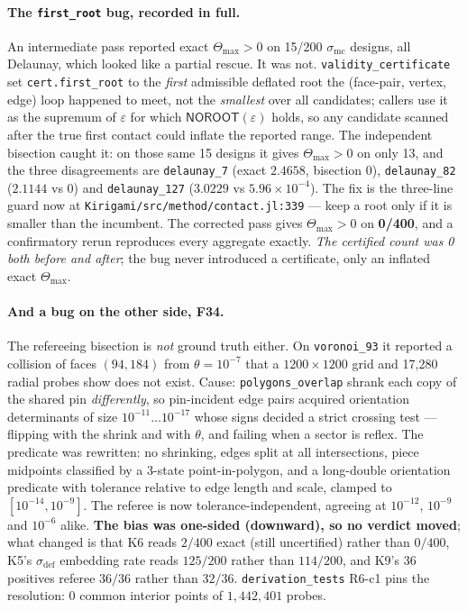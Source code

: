 \documentclass[11pt,a4paper]{article}
\theoremstyle{definition}
\newcommand{\Tmax}{\Theta_{\max}}
\newcommand{\file}[1]{\texttt{\small #1}}
\newcommand{\NOROOT}{\textsf{NOROOT}}
\begin{document}
\paragraph{The \file{first\_root} bug, recorded in full.} An intermediate pass reported exact
$\Tmax>0$ on 15/200 $\sigma_{\mathrm{mc}}$ designs, all Delaunay, which looked like a partial
rescue. It was not. \file{validity\_certificate} set \file{cert.first\_root} to the
\emph{first} admissible deflated root the (face-pair, vertex, edge) loop happened to meet,
not the \emph{smallest} over all candidates; callers use it as the supremum of $\varepsilon$
for which $\NOROOT(\varepsilon)$ holds, so any candidate scanned after the true first contact
could inflate the reported range. The independent bisection caught it: on those same 15
designs it gives $\Tmax>0$ on only 13, and the three disagreements are \file{delaunay\_7}
(exact $2.4658$, bisection $0$), \file{delaunay\_82} ($2.1144$ vs $0$) and
\file{delaunay\_127} ($3.0229$ vs $5.96\times10^{-4}$). The fix is the three-line guard now at
\file{Kirigami/src/method/contact.jl:339} --- keep a root only if it is smaller than the
incumbent. The corrected pass gives $\Tmax>0$ on \textbf{0/400}, and a confirmatory rerun
reproduces every aggregate exactly. \emph{The certified count was 0 both before and after};
the bug never introduced a certificate, only an inflated exact $\Tmax$.

\paragraph{And a bug on the other side, F34.} The refereeing bisection is \emph{not} ground
truth either. On \file{voronoi\_93} it reported a collision of faces $(94,184)$ from
$\theta=10^{-7}$ that a $1200\times1200$ grid and 17{,}280 radial probes show does not exist.
Cause: \file{polygons\_overlap} shrank each copy of the shared pin \emph{differently}, so
pin-incident edge pairs acquired orientation determinants of size $10^{-11}\dots10^{-17}$
whose signs decided a strict crossing test --- flipping with the shrink and with $\theta$, and
failing when a sector is reflex. The predicate was rewritten: no shrinking, edges split at all
intersections, piece midpoints classified by a 3-state point-in-polygon, and a long-double
orientation predicate with tolerance relative to edge length and scale, clamped to
$[10^{-14},10^{-9}]$. The referee is now tolerance-independent, agreeing at $10^{-12}$,
$10^{-9}$ and $10^{-6}$ alike. \textbf{The bias was one-sided (downward), so no verdict
moved}; what changed is that K6 reads $2/400$ exact (still uncertified) rather than $0/400$,
K5's $\sigma_{\mathrm{def}}$ embedding rate reads $125/200$ rather than $114/200$, and K9's 36
positives referee $36/36$ rather than $32/36$. \file{derivation\_tests} R6-c1 pins the
resolution: $0$ common interior points of $1{,}442{,}401$ probes.
\end{document}
